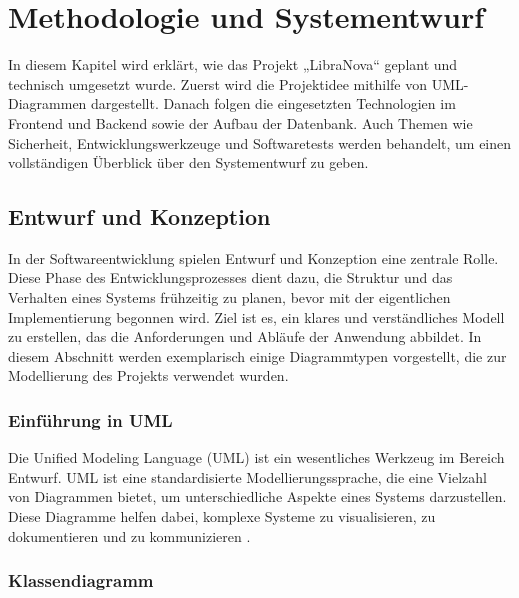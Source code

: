 \chapter{Methodologie und Systementwurf }

In diesem Kapitel wird erklärt, wie das Projekt „LibraNova“  geplant und technisch umgesetzt wurde. Zuerst wird die Projektidee mithilfe von UML-Diagrammen dargestellt. Danach folgen die eingesetzten Technologien im Frontend und Backend sowie der Aufbau der Datenbank. Auch Themen wie Sicherheit, Entwicklungswerkzeuge und Softwaretests werden behandelt, um einen vollständigen Überblick über den Systementwurf zu geben.



\section{Entwurf und Konzeption}

In der Softwareentwicklung spielen Entwurf und Konzeption eine zentrale Rolle. Diese Phase des Entwicklungsprozesses dient dazu, die Struktur und das Verhalten eines Systems frühzeitig zu planen, bevor mit der eigentlichen Implementierung begonnen wird. Ziel ist es, ein klares und verständliches Modell zu erstellen, das die Anforderungen und Abläufe der Anwendung abbildet. In diesem Abschnitt werden exemplarisch einige Diagrammtypen vorgestellt, die zur Modellierung des Projekts verwendet wurden.


\subsection{Einführung in UML}

Die Unified Modeling Language (UML) ist ein wesentliches Werkzeug im Bereich Entwurf. UML ist eine standardisierte Modellierungssprache, die eine Vielzahl von Diagrammen bietet, um unterschiedliche Aspekte eines Systems darzustellen. Diese Diagramme helfen dabei, komplexe Systeme zu visualisieren, zu dokumentieren und zu kommunizieren \cite{UML:2023}. 

\subsection{Klassendiagramm}

